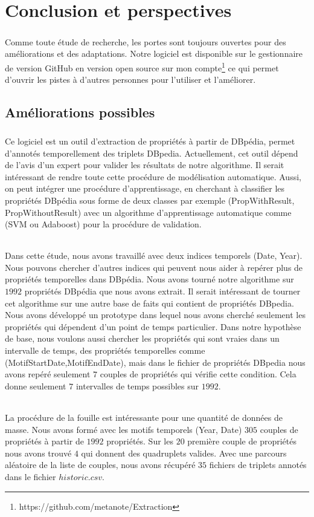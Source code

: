 \documentclass[12pt,a4	]{report}
\begin{document}
\chapter{Conclusion et perspectives}
\paragraph{}
Comme toute étude de recherche, les portes sont toujours ouvertes pour des améliorations et des adaptations. Notre logiciel est disponible sur le gestionnaire de version GitHub en version open source sur mon compte\footnote{https://github.com/metanote/Extraction} ce qui permet d'ouvrir les pistes à d'autres personnes pour l'utiliser et l'améliorer. 
\section*{Améliorations possibles}
\paragraph{}
Ce logiciel est un outil d'extraction de propriétés à partir de DBpédia, permet d'annotés temporellement des triplets DBpedia. Actuellement, cet outil dépend de l'avis d'un expert pour valider les résultats de notre algorithme. Il serait intéressant de rendre toute cette procédure de modélisation automatique. Aussi, on peut intégrer une procédure d'apprentissage, en cherchant à classifier les propriétés DBpédia sous forme de deux classes par exemple (PropWithResult, PropWithoutResult) avec un algorithme d'apprentissage automatique comme (SVM ou Adaboost) pour la procédure de validation.
\subparagraph{}
Dans cette étude, nous avons travaillé avec deux indices temporels (Date, Year). Nous pouvons chercher d'autres indices qui peuvent nous aider à repérer plus de propriétés temporelles dans DBpédia. Nous avons tourné notre algorithme sur $1992$ propriétés DBpédia que nous avons extrait. Il serait intéressant de tourner cet algorithme sur une autre base de faits qui contient de propriétés DBpedia.
Nous avons développé un prototype dans lequel nous avons cherché seulement les propriétés qui dépendent d'un point de temps particulier.
Dans notre hypothèse de base, nous voulons aussi chercher les propriétés qui sont vraies dans un intervalle de temps, des propriétés temporelles comme (MotifStartDate,MotifEndDate), mais dans le fichier de propriétés DBpedia nous avons repéré seulement $7$ couples de propriétés qui vérifie cette condition. Cela donne seulement $7$ intervalles de temps possibles sur $1992$.
\subparagraph{}
La procédure de la fouille est intéressante pour une quantité de données de masse. Nous avons formé avec les motifs temporels (Year, Date) $305$ couples de propriétés à partir de $1992$ propriétés. Sur les $20$ première couple de propriétés nous avons trouvé $4$ qui donnent des quadruplets valides. Avec une parcours aléatoire de la liste de couples, nous avons récupéré $35$ fichiers de triplets annotés dans le fichier $historic.csv$.
\end{document}
